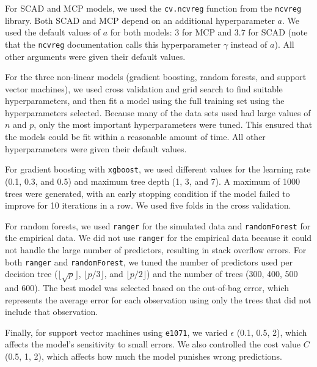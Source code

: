 \documentclass{article}
\begin{document}
For SCAD and MCP models, we used the \lstinline!cv.ncvreg! function from the \lstinline!ncvreg! library. Both SCAD and MCP depend on an additional hyperparameter $a$. We used the default values of $a$ for both models: 3 for MCP and 3.7 for SCAD (note that the \lstinline!ncvreg! documentation calls this hyperparameter $\gamma$ instead of $a$). All other arguments were given their default values. 

For the three non-linear models (gradient boosting, random forests, and support vector machines), we used cross validation and grid search to find suitable hyperparameters, and then fit a model using the full training set using the hyperparameters selected. Because many of the data sets used had large values of $n$ and $p$, only the most important hyperparameters were tuned. This ensured that the models could be fit within a reasonable amount of time. All other hyperparameters were given their default values.

For gradient boosting with \lstinline!xgboost!, we used different values for the learning rate (0.1, 0.3, and 0.5) and maximum tree depth (1, 3, and 7). A maximum of 1000 trees were generated, with an early stopping condition if the model failed to improve for 10 iterations in a row. We used five folds in the cross validation.

For random forests, we used \lstinline!ranger! for the simulated data and \lstinline!randomForest! for the empirical data. We did not use \lstinline!ranger! for the empirical data because it could not handle the large number of predictors, resulting in stack overflow errors. For both \lstinline!ranger! and \lstinline!randomForest!, we tuned the number of predictors used per decision tree ($\lfloor \sqrt{p}\rfloor$, $\lfloor p / 3 \rfloor$, and $\lfloor p / 2 \rfloor$) and the number of trees (300, 400, 500 and 600). The best model was selected based on the out-of-bag error, which represents the average error for each observation using only the trees that did not include that observation.

Finally, for support vector machines using \lstinline!e1071!, we varied $\epsilon$ (0.1, 0.5, 2), which affects the model's sensitivity to small errors. We also controlled the cost value $C$ (0.5, 1, 2), which affects how much the model punishes wrong predictions.
\end{document}
